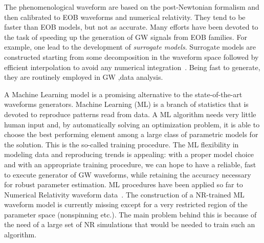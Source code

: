 The phenomenological waveform are based on the post-Newtonian formalism and then calibrated 
to  EOB waveforms and numerical relativity. They tend to be faster than EOB models, but not as accurate.
Many efforts have been devoted to the task of speeding up the generation of GW signals from 
EOB families. For example, one lead to the development of \textit{surrogate models}. Surrogate 
models are constructed starting from some decomposition in the waveform space followed by efficient 
interpolation to avoid any  numerical integration~\cite{Purrer:2015tud,Bohe:2016gbl,Purrer:2017str,Lackey:2018zvw,Cotesta:2020qhw}. 
Being fast to generate, they are routinely employed in GW ,data analysis. 
\par
A Machine Learning model is a promising alternative to the state-of-the-art waveforms generators. Machine Learning (ML) is a branch 
of statistics that is devoted to reproduce patterns read from data. A ML algorithm needs very little human input and, by 
automatically solving an optimization problem, it is able to choose the best performing element among a large 
class of parametric models for the solution. This is the so-called training procedure. 
The ML flexibility in modeling data and reproducing trends is appealing: with a proper model choice and with an appropriate training 
procedure, we can hope to have a reliable, fast to execute generator of GW waveforms, while retaining the accuracy necessary for robust parameter estimation. ML procedures have been applied so far to Numerical Relativity 
waveform data~\cite{Gabbard:2017lja,George:2017pmj,George:2017vlv,Rebei:2018lzh,Khan:2020foe}.
The construction of a NR-trained ML waveform model is currently missing except for a very 
restricted region of the parameter space (nonspinning etc.). The main problem behind this is 
because of the need of a large set of NR simulations that would be needed to train such an algorithm.

